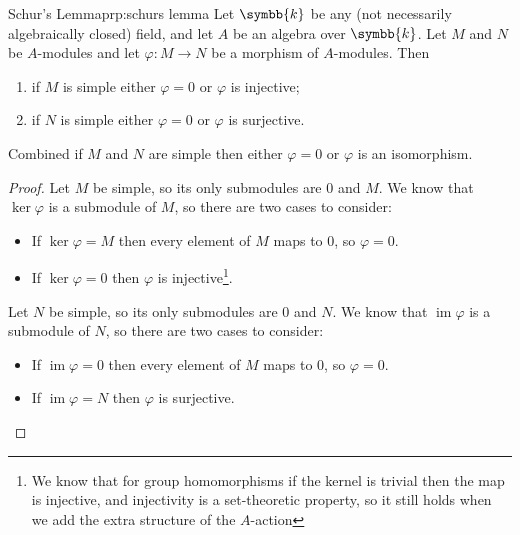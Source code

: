 \documentclass[fleqn]{NotesClass}
\renewcommand{\field}{\symbb{k}}
\DeclareMathOperator{\im}{im}
\begin{document}
    \begin{prp}{Schur's Lemma}{prp:schurs lemma}
        Let \(\field\) be any (not necessarily algebraically closed) field, and let \(A\) be an algebra over \(\field\).
        Let \(M\) and \(N\) be \(A\)-modules and let \(\varphi \colon M \to N\) be a morphism of \(A\)-modules.
        Then
        \begin{enumerate}
            \item if \(M\) is simple either \(\varphi = 0\) or \(\varphi\) is injective;
            \item if \(N\) is simple either \(\varphi = 0\) or \(\varphi\) is surjective.
        \end{enumerate}
        Combined if \(M\) and \(N\) are simple then either \(\varphi = 0\) or \(\varphi\) is an isomorphism.
        \begin{proof}
            Let \(M\) be simple, so its only submodules are \(0\) and \(M\).
            We know that \(\ker \varphi\) is a submodule of \(M\), so there are two cases to consider:
            \begin{itemize}
                \item If \(\ker \varphi = M\) then every element of \(M\) maps to \(0\), so \(\varphi = 0\).
                \item If \(\ker \varphi = 0\) then \(\varphi\) is injective\footnote{We know that for group homomorphisms if the kernel is trivial then the map is injective, and injectivity is a set-theoretic property, so it still holds when we add the extra structure of the \(A\)-action}.
            \end{itemize}
            
            Let \(N\) be simple, so its only submodules are \(0\) and \(N\).
            We know that \(\im \varphi\) is a submodule of \(N\), so there are two cases to consider:
            \begin{itemize}
                \item If \(\im \varphi = 0\) then every element of \(M\) maps to \(0\), so \(\varphi = 0\).
                \item If \(\im \varphi = N\) then \(\varphi\) is surjective.
            \end{itemize}
        \end{proof}
    \end{prp}
    
\end{document}
